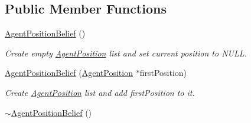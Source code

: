\subsection*{Public Member Functions}
\begin{DoxyCompactItemize}
\item 
\hypertarget{class_agent_position_belief_a8dd3de3cf2f95f730fe294cdb11e07b1}{
\hyperlink{class_agent_position_belief_a8dd3de3cf2f95f730fe294cdb11e07b1}{AgentPositionBelief} ()}
\label{class_agent_position_belief_a8dd3de3cf2f95f730fe294cdb11e07b1}

\begin{DoxyCompactList}\small\item\em Create empty \hyperlink{class_agent_position}{AgentPosition} list and set current position to NULL. \end{DoxyCompactList}\item 
\hyperlink{class_agent_position_belief_a4912fe0dfd751a25c1fed98f16241ef2}{AgentPositionBelief} (\hyperlink{class_agent_position}{AgentPosition} $\ast$firstPosition)
\begin{DoxyCompactList}\small\item\em Create \hyperlink{class_agent_position}{AgentPosition} list and add firstPosition to it. \end{DoxyCompactList}\item 
\hypertarget{class_agent_position_belief_aad7647aca1143286b45043bba8b259e0}{
\hyperlink{class_agent_position_belief_aad7647aca1143286b45043bba8b259e0}{$\sim$AgentPositionBelief} ()}
\label{class_agent_position_belief_aad7647aca1143286b45043bba8b259e0}


\end{DoxyCompactItemize}
